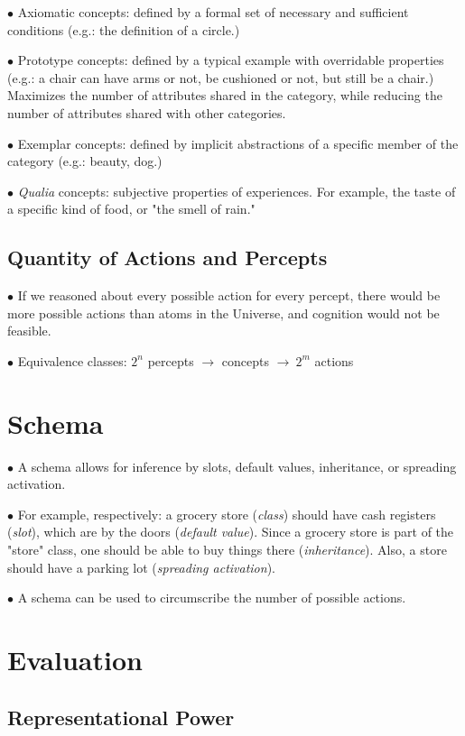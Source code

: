 \documentclass[english,openany]{book}
\begin{document}
$\bullet$ Axiomatic concepts: defined by a formal set of necessary and sufficient conditions (e.g.: the definition of a circle.)

$\bullet$ Prototype concepts: defined by a typical example with overridable properties (e.g.: a chair can have arms or not, be cushioned or not, but still be a chair.) Maximizes the number of attributes shared in the category, while reducing the number of attributes shared with other categories.

$\bullet$ Exemplar concepts: defined by implicit abstractions of a specific member of the category (e.g.: beauty, dog.)

$\bullet$ \textit{Qualia} concepts: subjective properties of experiences. For example, the taste of a specific kind of food, or "the smell of rain."

\subsection{Quantity of Actions and Percepts}

$\bullet$ If we reasoned about every possible action for every percept, there would be more possible actions than atoms in the Universe, and cognition would not be feasible.

$\bullet$ Equivalence classes: $2^n$ percepts $\rightarrow$ concepts $\rightarrow\ 2^m$ actions

\section{Schema}

$\bullet$ A schema allows for inference by slots, default values, inheritance, or spreading activation.

$\bullet$ For example, respectively: a grocery store (\textit{class}) should have cash registers (\textit{slot}), which are by the doors (\textit{default value}). Since a grocery store is part of the "store" class, one should be able to buy things there (\textit{inheritance}). Also, a store should have a parking lot (\textit{spreading activation}).

$\bullet$ A schema can be used to circumscribe the number of possible actions.

\section{Evaluation}

\subsection{Representational Power}
\end{document}
